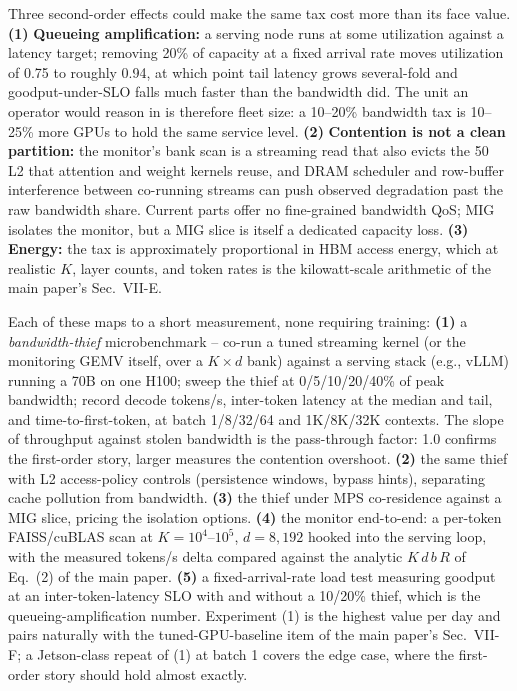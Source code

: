 Three second-order effects could make the same tax cost more than its
face value. {\bf (1)} \textbf{Queueing amplification:} a serving node
runs at some utilization against a latency target; removing 20\% of
capacity at a fixed arrival rate moves utilization of 0.75 to roughly
0.94, at which point tail latency grows several-fold and
goodput-under-SLO falls much faster than the bandwidth did. The unit
an operator would reason in is therefore fleet size: a 10--20\%
bandwidth tax is 10--25\% more GPUs to hold the same service level.
{\bf (2)} \textbf{Contention is not a clean partition:} the monitor's
bank scan is a streaming read that also evicts the \qty{50}{\mega\byte}
L2 that attention and weight kernels reuse, and DRAM scheduler and
row-buffer interference between co-running streams can push observed
degradation past the raw bandwidth share. Current parts offer no
fine-grained bandwidth QoS; MIG isolates the monitor, but a MIG slice
is itself a dedicated capacity loss. {\bf (3)} \textbf{Energy:} the
tax is approximately proportional in HBM access energy, which at
realistic $K$, layer counts, and token rates is the kilowatt-scale
arithmetic of the main paper's Sec.~VII-E.

Each of these maps to a short measurement, none requiring training:
{\bf (1)} a \emph{bandwidth-thief} microbenchmark -- co-run a tuned
streaming kernel (or the monitoring GEMV itself, over a $K\times d$
bank) against a serving stack (e.g., vLLM) running a 70B on one H100;
sweep the thief at 0/5/10/20/40\% of peak bandwidth; record decode
tokens/s, inter-token latency at the median and tail, and
time-to-first-token, at batch 1/8/32/64 and 1K/8K/32K contexts. The
slope of throughput against stolen bandwidth is the pass-through
factor: 1.0 confirms the first-order story, larger measures the
contention overshoot.
{\bf (2)} the same thief with L2 access-policy controls (persistence
windows, bypass hints), separating cache pollution from bandwidth.
{\bf (3)} the thief under MPS co-residence against a MIG slice,
pricing the isolation options.
{\bf (4)} the monitor end-to-end: a per-token FAISS/cuBLAS scan at
$K=10^{4}$--$10^{5}$, $d=8{,}192$ hooked into the serving loop, with
the measured tokens/s delta compared against the analytic
$K\,d\,b\,R$ of Eq.~(2) of the main paper.
{\bf (5)} a fixed-arrival-rate load test measuring goodput at an
inter-token-latency SLO with and without a 10/20\% thief, which is
the queueing-amplification number.
Experiment (1) is the highest value per day and pairs naturally with
the tuned-GPU-baseline item of the main paper's Sec.~VII-F;
a Jetson-class repeat of (1) at batch 1 covers the edge case, where
the first-order story should hold almost exactly.
